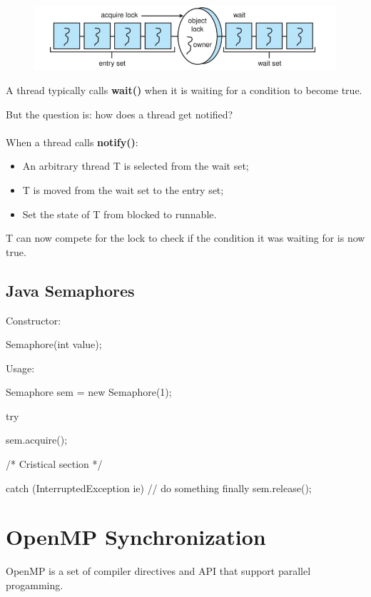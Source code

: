 \begin{figure}[htbp]
    \centering
    \includegraphics[width=0.65\linewidth]{img/adavasd.png}
\end{figure}


A thread typically calls \textbf{wait()} when it is waiting for a condition to
become true.

But the question is: how does a thread get notified?
\paragraph{}

When a thread calls \textbf{notify()}:

\begin{itemize}
    \item An arbitrary thread T is selected from the wait set;
    \item T is moved from the wait set to the entry set;
    \item Set the state of T from blocked to runnable.
\end{itemize}
T can now compete for the lock to check if the condition it was waiting for is now true.

\subsection{Java Semaphores}

Constructor:

\begin{codeInJava}
Semaphore(int value);
\end{codeInJava}

Usage:

\begin{codeInJava}
Semaphore sem = new Semaphore(1);

try{

    sem.acquire();

    /* Cristical section */

}catch (InterruptedException ie) {
    // do something
}finally{
    sem.release();
}
\end{codeInJava}

\newpage
\section{OpenMP Synchronization}
OpenMP is a set of compiler directives and API that support
parallel progamming.

